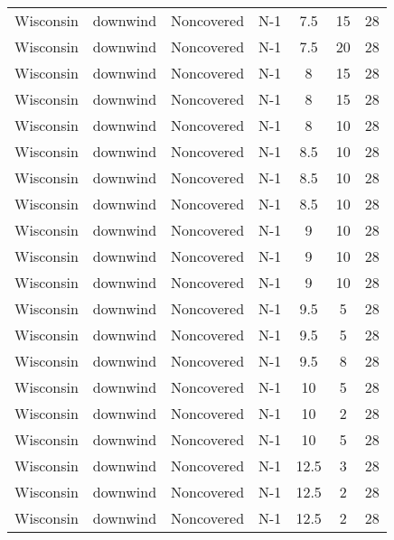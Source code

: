 \documentclass{article}
\begin{document}
\begin{longtable}[c]{ccccccc}
Wisconsin & downwind  & Noncovered & N-1             & 7.5          & 15          & 28  \\
Wisconsin & downwind  & Noncovered & N-1             & 7.5          & 20          & 28  \\
Wisconsin & downwind  & Noncovered & N-1             & 8            & 15          & 28  \\
Wisconsin & downwind  & Noncovered & N-1             & 8            & 15          & 28  \\
Wisconsin & downwind  & Noncovered & N-1             & 8            & 10          & 28  \\
Wisconsin & downwind  & Noncovered & N-1             & 8.5          & 10          & 28  \\
Wisconsin & downwind  & Noncovered & N-1             & 8.5          & 10          & 28  \\
Wisconsin & downwind  & Noncovered & N-1             & 8.5          & 10          & 28  \\
Wisconsin & downwind  & Noncovered & N-1             & 9            & 10          & 28  \\
Wisconsin & downwind  & Noncovered & N-1             & 9            & 10          & 28  \\
Wisconsin & downwind  & Noncovered & N-1             & 9            & 10          & 28  \\
Wisconsin & downwind  & Noncovered & N-1             & 9.5          & 5           & 28  \\
Wisconsin & downwind  & Noncovered & N-1             & 9.5          & 5           & 28  \\
Wisconsin & downwind  & Noncovered & N-1             & 9.5          & 8           & 28  \\
Wisconsin & downwind  & Noncovered & N-1             & 10           & 5           & 28  \\
Wisconsin & downwind  & Noncovered & N-1             & 10           & 2           & 28  \\
Wisconsin & downwind  & Noncovered & N-1             & 10           & 5           & 28  \\
Wisconsin & downwind  & Noncovered & N-1             & 12.5         & 3           & 28  \\
Wisconsin & downwind  & Noncovered & N-1             & 12.5         & 2           & 28  \\
Wisconsin & downwind  & Noncovered & N-1             & 12.5         & 2           & 28  \\

\end{longtable}
\end{document}

